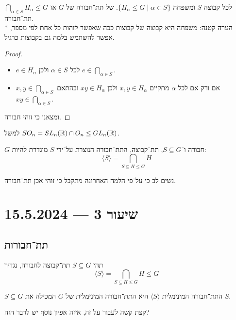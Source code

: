 \begin{lemma}
	לכל קבוצה $S$ ומשפחה $\{ H_\alpha \le G \mid \alpha \in S\}$. של תת־חבורה של $G$ אז $\bigcap_{\alpha \in S} H_\alpha \le G$ תת־חבורה. \\*
	הערה קטנה: משפחה היא קבוצה של קבוצות ככה שאפשר לזהות כל אחת לפי מספר, אפשר להשתמש בלמה גם בקבוצות כרגיל.
\end{lemma}
\begin{proof}
	\begin{itemize}
		\item $e \in H_\alpha$ לכל $\alpha \in S$ ולכן $e \in \bigcap_{\alpha \in S}$.
		\item $x, y \in \bigcap_{\alpha \in S}$ אם ורק אם לכל $\alpha$ מתקיים $x, y \in H_\alpha$ ולכן $xy \in H_\alpha$ ובהתאם $xy \in \bigcap_{\alpha \in S}$.
	\end{itemize}
	ומצאנו כי זוהי חבורה.
\end{proof}
למשל $SO_n = SL_n(\mathbb{R}) \cap O_n \le GL_n(\mathbb{R})$.
\begin{definition}
	$G$ חבורה ו־$S \subseteq G$, תת־קבוצה, התת־חבורה הנוצרת על־ידי $S$ מוגדרת להיות:
	\[
		\langle S \rangle = \bigcap_{S \subseteq H \le G} H
	\]
\end{definition}
נשים לב כי על־פי הלמה האחרונה מתקבל כי זוהי אכן תת־חבורה.

\section{שיעור 3 --- 15.5.2024}
\subsection{תת־חבורות}
\begin{definition}
	תהי $S \subseteq G$ תת־קבוצה לחבורה, נגדיר
	\[
		\langle S \rangle = \bigcap_{S \subseteq H \le G} H \le G
	\]
\end{definition}
\begin{lemma}
	$S \subseteq G$ התת־חבורה המינימלית $\langle S \rangle$ היא התת־חבורה המינימלית של $G$ המכילה את $S$.
\end{lemma}
קצת קשה לעבור על זה, איזה אפיון נוסף יש לדבר הזה?

